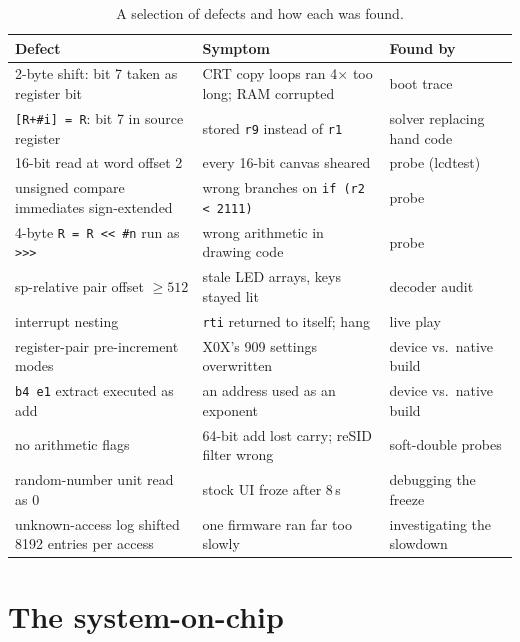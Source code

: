 \documentclass[10pt,a4paper]{article}
\newcommand{\code}[1]{\texttt{#1}}
\begin{document}
\begin{table}[t]
\centering\footnotesize
\begin{tabularx}{\textwidth}{@{}>{\raggedright}p{43mm}X>{\raggedright\arraybackslash}p{33mm}@{}}
\toprule
Defect & Symptom & Found by\\
\midrule
2-byte shift: bit 7 taken as register bit & CRT copy loops ran 4$\times$ too long; RAM corrupted & boot trace\\
\code{[R+\#i] = R}: bit 7 in source register & stored \code{r9} instead of \code{r1} & solver replacing hand code\\
16-bit read at word offset 2 & every 16-bit canvas sheared & probe (lcdtest)\\
unsigned compare immediates sign-extended & wrong branches on \code{if (r2 < 2111)} & probe\\
4-byte \code{R = R << \#n} run as \code{>>>} & wrong arithmetic in drawing code & probe\\
sp-relative pair offset $\ge 512$ & stale LED arrays, keys stayed lit & decoder audit\\
interrupt nesting & \code{rti} returned to itself; hang & live play\\
register-pair pre-increment modes & X0X's 909 settings overwritten & device vs.\ native build\\
\code{b4 e1} extract executed as add & an address used as an exponent & device vs.\ native build\\
no arithmetic flags & 64-bit add lost carry; reSID filter wrong & soft-double probes\\
random-number unit read as 0 & stock UI froze after 8\,s & debugging the freeze\\
unknown-access log shifted 8192 entries per access & one firmware ran far too slowly & investigating the slowdown\\
\bottomrule
\end{tabularx}
\caption{A selection of defects and how each was found.}
\label{tab:bugs}
\end{table}

\section{The system-on-chip}
\end{document}
